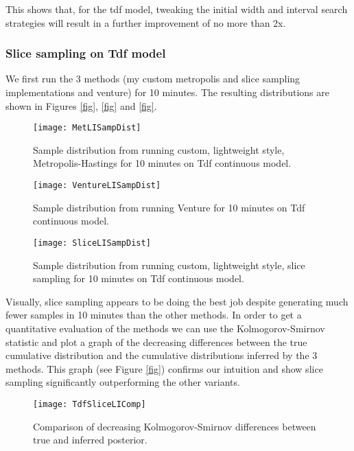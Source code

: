 This shows that, for the tdf model, tweaking the initial width and interval search strategies will result in a further improvement of no more than 2x.

\subsubsection{Slice sampling on Tdf model}
We first run the 3 methods (my custom metropolis and slice sampling implementations and venture) for 10 minutes. The resulting distributions are shown in Figures \ref{fig}, \ref{fig} and \ref{fig}.

\begin{figure}[H]
    \centering
    \texttt{[image: MetLISampDist]}
    \caption{Sample distribution from running custom, lightweight style, Metropolis-Hastings for 10 minutes on Tdf continuous model.}
    \label{fig:MetLISampDist}
\end{figure}

\begin{figure}[H]
    \centering
    \texttt{[image: VentureLISampDist]}
    \caption{Sample distribution from running Venture for 10 minutes on Tdf continuous model.}
    \label{fig:VentureLISampDist}
\end{figure}

\begin{figure}[H]
    \centering
    \texttt{[image: SliceLISampDist]}
    \caption{Sample distribution from running custom, lightweight style, slice sampling for 10 minutes on Tdf continuous model.}
    \label{fig:SliceLISampDist}
\end{figure}

Visually, slice sampling appears to be doing the best job despite generating much fewer samples in 10 minutes than the other methods. In order to get a quantitative evaluation of the methods we can use the Kolmogorov-Smirnov statistic and plot a graph of the decreasing differences between the true cumulative distribution and the cumulative distributions inferred by the 3 methods. This graph (see Figure \ref{fig}) confirms our intuition and show slice sampling significantly outperforming the other variants. 

\begin{figure}[H]
    \centering
    \texttt{[image: TdfSliceLIComp]}
    \caption{Comparison of decreasing Kolmogorov-Smirnov differences between true and inferred posterior.}
    \label{fig:TdfSliceLIComp}
\end{figure}

